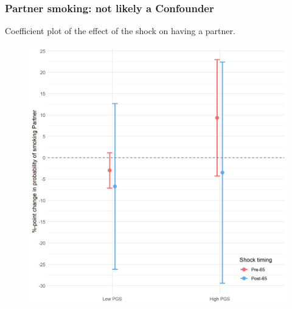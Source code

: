 \documentclass[10pt,compress,xcolor=dvipsnames,aspectratio=169]{beamer}    %
\newcounter{ex}
\newcommand{\1}[1]{\mathrm{1\hspace*{-2.5pt}l}[#1]}	%
\begin{document}
\begin{frame}
\frametitle{Partner smoking: not likely a Confounder}
Coefficient plot of the effect of the shock on having a partner.
\begin{figure}[hbtp]
\centering
\includegraphics[height=0.8\textheight]{../../3_output/shock_effects/smokePartner_6070_100_cv.png}
\label{fig:smokePartner}
\end{figure}
\end{frame}
\end{document}
